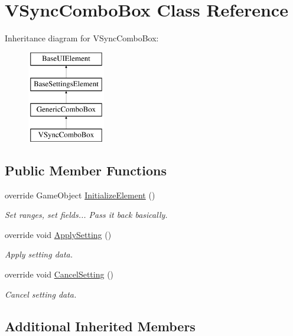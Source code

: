 \hypertarget{class_v_sync_combo_box}{}\section{V\+Sync\+Combo\+Box Class Reference}
\label{class_v_sync_combo_box}
Inheritance diagram for V\+Sync\+Combo\+Box\+:\begin{figure}[H]
\begin{center}
\leavevmode
\includegraphics[height=4.000000cm]{class_v_sync_combo_box}
\end{center}
\end{figure}
\subsection*{Public Member Functions}
\begin{DoxyCompactItemize}
\item 
override Game\+Object \hyperlink{class_v_sync_combo_box_a6de5084b8e4b47a434de53bab6650d82}{Initialize\+Element} ()
\begin{DoxyCompactList}\small\item\em Set ranges, set fields... Pass it back basically. \end{DoxyCompactList}\item 
override void \hyperlink{class_v_sync_combo_box_a5d6d9a0895ae75f608a7107ce1ef5d31}{Apply\+Setting} ()
\begin{DoxyCompactList}\small\item\em Apply setting data. \end{DoxyCompactList}\item 
override void \hyperlink{class_v_sync_combo_box_a76f577ef0c4f59871313a824ef98058e}{Cancel\+Setting} ()
\begin{DoxyCompactList}\small\item\em Cancel setting data. \end{DoxyCompactList}\end{DoxyCompactItemize}
\subsection*{Additional Inherited Members}


